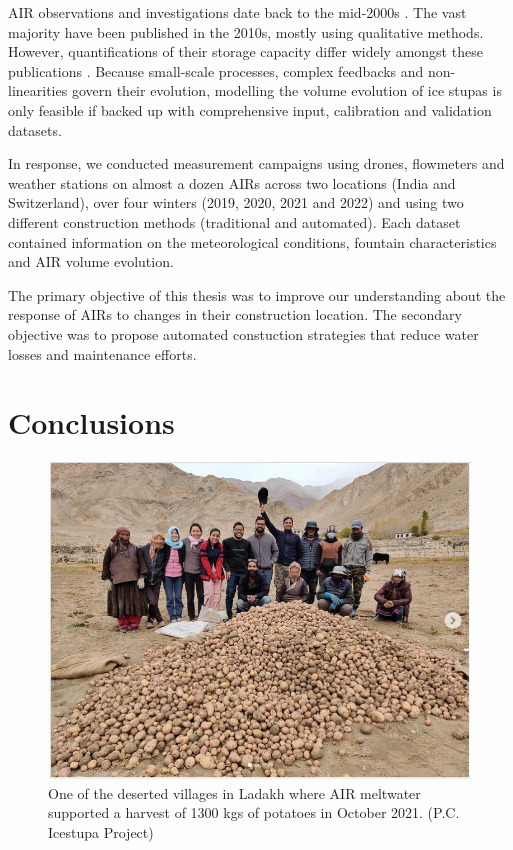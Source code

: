 AIR observations and investigations date back to the mid-2000s \citep{tveitenGlacierGrowingLocal2007}. The vast
majority have been published in the 2010s, mostly using qualitative methods. However, quantifications of their
storage capacity differ widely amongst these publications \citep{baglaArtificialGlaciersHelp1998,
norphelSnowWaterHarvesting2015, nusserSociohydrologyArtificialGlaciers2019}. Because small-scale processes,
complex feedbacks and non-linearities govern their evolution, modelling the volume evolution of ice stupas is
only feasible if backed up with comprehensive input, calibration and validation datasets.

In response, we conducted measurement campaigns using drones, flowmeters and weather stations on almost a dozen
AIRs across two locations (India and Switzerland), over four winters (2019, 2020, 2021 and 2022) and using two
different construction methods (traditional and automated). Each dataset contained information on the
meteorological conditions, fountain characteristics and AIR volume evolution. 

The primary objective of this thesis was to improve our understanding about the response of AIRs to changes in
their construction location. The secondary objective was to propose automated constuction strategies that reduce
water losses and maintenance efforts.  

\section{Conclusions}

\begin{figure}[htb]
	\includegraphics[width=\textwidth]{figs/Kullum_potatoes}
	\caption{One of the deserted villages in Ladakh where AIR meltwater supported a harvest of 1300 kgs of
  potatoes in October 2021. (P.C. Icestupa Project)}
	\label{fig:kullum_potatoes}
\end{figure}


